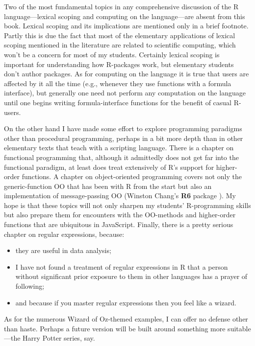 \documentclass[]{book}
\providecommand{\tightlist}{%
  \setlength{\itemsep}{0pt}\setlength{\parskip}{0pt}}
\theoremstyle{definition}
\theoremstyle{definition}
\theoremstyle{definition}
\theoremstyle{remark}
\begin{document}
Two of the most fundamental topics in any comprehensive discussion of
the R language---lexical scoping and computing on the language---are
absent from this book. Lexical scoping and its implications are
mentioned only in a brief footnote. Partly this is due the fact that
most of the elementary applications of lexical scoping mentioned in the
literature are related to scientific computing, which won't be a concern
for most of my students. Certainly lexical scoping is important for
understanding how R-packages work, but elementary students don't author
packages. As for computing on the language it is true that users are
affected by it all the time (e.g., whenever they use functions with a
formula interface), but generally one need not perform any computation
on the language until one begins writing formula-interface functions for
the benefit of casual R-users.

On the other hand I have made some effort to explore programming
paradigms other than procedural programming, perhaps in a bit more depth
than in other elementary texts that teach with a scripting language.
There is a chapter on functional programming that, although it
admittedly does not get far into the functional paradigm, at least does
treat extensively of R's support for higher-order functions. A chapter
on object-oriented programming covers not only the generic-function OO
that has been with R from the start but also an implementation of
message-passing OO (Winston Chang's \textbf{R6} package \citep{R-R6}).
My hope is that these topics will not only sharpen my students'
R-programming skills but also prepare them for encounters with the
OO-methods and higher-order functions that are ubiquitous in JavaScript.
Finally, there is a pretty serious chapter on regular expressions,
because:

\begin{itemize}
\tightlist
\item
  they are useful in data analysis;
\item
  I have not found a treatment of regular expressions in R that a person
  without significant prior exposure to them in other languages has a
  prayer of following;
\item
  and because if you master regular expressions then you feel like a
  wizard.
\end{itemize}

As for the numerous Wizard of Oz-themed examples, I can offer no defense
other than haste. Perhaps a future version will be built around
something more suitable---the Harry Potter series, say.
\end{document}
